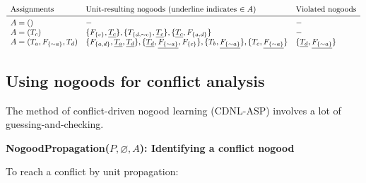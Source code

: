 \documentclass[9pt,a4paper,landscape]{article}
\newcommand{\ngtb}[1]{T_{ \{#1\} }}
\newcommand{\ngfb}[1]{F_{ \{#1\} }}
\newcommand{\ngta}[1]{T_{#1}}
\begin{document}
{\begin{center}
	$\begin{array}{lll}
	\text{Assignments} & \text{Unit-resulting nogoods (underline indicates $\in A$)} & \text{Violated nogoods}\\ \midrule
	A = () & - & - \\
	A = (\ngta{c}) & \{\ngfb{c}, \underline{\ngta{c}}\}, \{\ngtb{d, {\sim} c}, \underline{\ngta{c}}\}, \{\underline{\ngta{c}}, \ngfb{a, d}\} & -\\
	A = (\ngta{a}, \ngfb{{\sim} a}, \ngta{d}) & \{\ngfb{a, d}, \underline{\ngta{a}}, \underline{\ngta{d}}\}, \{\underline{\ngta{d}}, \underline{\ngfb{{\sim} a}}, \ngfb{c}\}, \{\ngta{b}, \underline{\ngfb{{\sim} a}}\}, \{\ngta{c}, \underline{\ngfb{{\sim} a}}\} & \{\underline{\ngta{d}}, \underline{\ngfb{{\sim} a}}\} \\
\end{array}$
\end{center}


\subsection{Using nogoods for conflict analysis}
\label{subsec:ng-confl}

The method of conflict-driven nogood learning (CDNL-ASP) involves a lot of guessing-and-checking.

\vspace{\baselineskip}
\textbf{NogoodPropagation($P, \varnothing, A$): Identifying a conflict nogood}

To reach a conflict by unit propagation:

}
\end{document}
